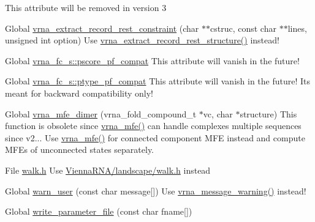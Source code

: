 \begin{DoxyRefList}
%
This attribute will be removed in version 3  
\item[Global \mbox{\hyperlink{group__file__formats_ga55a9ae6dfeecc1b3f0c2acf6fa796c15}{vrna\+\_\+extract\+\_\+record\+\_\+rest\+\_\+constraint}} (char $\ast$$\ast$cstruc, const char $\ast$$\ast$lines, unsigned int option)]\label{deprecated__deprecated000165}%
%
Use \mbox{\hyperlink{group__file__formats_gac788da233f9160b06c2e751afad8936c}{vrna\+\_\+extract\+\_\+record\+\_\+rest\+\_\+structure()}} instead!  
\item[Global \mbox{\hyperlink{group__fold__compound_abf5e82d14649b6179ae60ed7da6e4fc0}{vrna\+\_\+fc\+\_\+s\+::pscore\+\_\+pf\+\_\+compat}} ]\label{deprecated__deprecated000079}%
%
This attribute will vanish in the future!  
\item[Global \mbox{\hyperlink{group__fold__compound_a7fe1235ce3d41287695f1ae1e283e8fc}{vrna\+\_\+fc\+\_\+s\+::ptype\+\_\+pf\+\_\+compat}} ]\label{deprecated__deprecated000078}%
%
This attribute will vanish in the future! It\textquotesingle{}s meant for backward compatibility only!  
\item[Global \mbox{\hyperlink{group__mfe__global_gaab22d10c1190f205f16a77cab9d5d3ee}{vrna\+\_\+mfe\+\_\+dimer}} (vrna\+\_\+fold\+\_\+compound\+\_\+t $\ast$vc, char $\ast$structure)]\label{deprecated__deprecated000089}%
%
This function is obsolete since \mbox{\hyperlink{group__mfe__global_gabd3b147371ccf25c577f88bbbaf159fd}{vrna\+\_\+mfe()}} can handle complexes multiple sequences since v2... Use \mbox{\hyperlink{group__mfe__global_gabd3b147371ccf25c577f88bbbaf159fd}{vrna\+\_\+mfe()}} for connected component MFE instead and compute MFEs of unconnected states separately. 
\item[File \mbox{\hyperlink{walk_8h}{walk.h}} ]\label{deprecated__deprecated000142}%
%
Use \mbox{\hyperlink{landscape_2walk_8h}{Vienna\+RNA/landscape/walk.\+h}} instead  
\item[Global \mbox{\hyperlink{utils_2basic_8h_af2355fa8746f2f30fbe71db65dea3d51}{warn\+\_\+user}} (const char message\mbox{[}\mbox{]})]\label{deprecated__deprecated000185}%
%
Use \mbox{\hyperlink{group__message__utils_ga6e07ed24add60693ba886d54d0a46635}{vrna\+\_\+message\+\_\+warning()}} instead!  
\item[Global \mbox{\hyperlink{group__energy__parameters__rw_ga8a43459be386a7489feeab68dc2c6c76}{write\+\_\+parameter\+\_\+file}} (const char fname\mbox{[}\mbox{]})]\label{deprecated__deprecated000154}%

\end{DoxyRefList}
